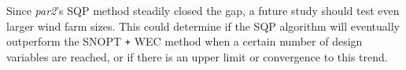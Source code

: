 	Since \textit{par2}'s SQP method steadily closed the gap, a future study should test even larger wind farm sizes.
	This could determine if the SQP algorithm will eventually outperform the SNOPT \texttt{+} WEC method when a certain number of design variables are reached, or if there is an upper limit or convergence to this trend.